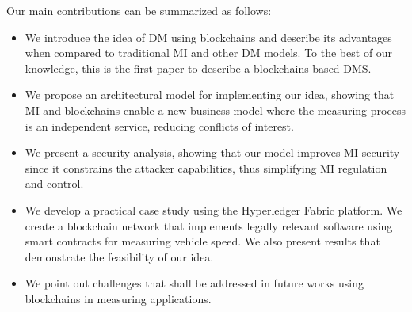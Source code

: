 \documentclass[journal]{IEEEtran}
\begin{document}

Our main contributions can be summarized as follows:
\begin{itemize}
 \item We introduce the idea of DM using blockchains and describe its advantages when compared to traditional MI and other DM models. To the best of our knowledge, this is the first paper to describe a blockchains-based DMS.
 \item We propose an architectural model for implementing our idea, showing that MI and blockchains enable a new business model where the measuring process is an independent service, reducing conflicts of interest.
 \item We present a security analysis, showing that our model improves MI security since it constrains the attacker capabilities, thus simplifying MI regulation and control.
 \item We develop a practical case study using the Hyperledger Fabric \cite{Androulaki2018} platform. We create a blockchain network that implements legally relevant software using smart contracts for measuring vehicle speed. We also present results that demonstrate the feasibility of our idea.
 \item We point out challenges that shall be addressed in future works using blockchains in measuring applications.
\end{itemize}

\end{document}
